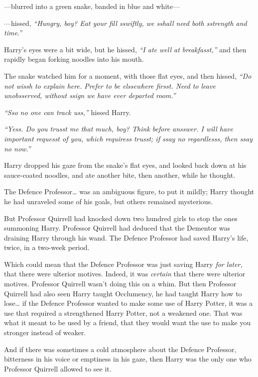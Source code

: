 ---blurred into a green snake, banded in blue and white---

---hissed, \emph{``Hungry, boy? Eat your fill sswiftly, we sshall need
both sstrength and time.''}

Harry's eyes were a bit wide, but he hissed, \emph{``I ate well at
breakfasst,''} and then rapidly began forking noodles into his mouth.

The snake watched him for a moment, with those flat eyes, and then
hissed, \emph{``Do not wissh to explain here. Prefer to be elssewhere
firsst. Need to leave unobsserved, without ssign we have ever departed
room.''}

\emph{``Sso no one can track uss,''} hissed Harry.

\emph{``Yess. Do you trusst me that much, boy? Think before ansswer. I
will have important requesst of you, which requiress trusst; if ssay no
regardlesss, then ssay no now.''}

Harry dropped his gaze from the snake's flat eyes, and looked back down
at his sauce-coated noodles, and ate another bite, then another, while
he thought.

The Defence Professor\ldots{} was an ambiguous figure, to put it mildly;
Harry thought he had unraveled some of his goals, but others remained
mysterious.

But Professor Quirrell had knocked down two hundred girls to stop the
ones summoning Harry. Professor Quirrell had deduced that the Dementor
was draining Harry through his wand. The Defence Professor had saved
Harry's life, twice, in a two-week period.

Which could mean that the Defence Professor was just saving Harry
\emph{for later,} that there were ulterior motives. Indeed, it was
\emph{certain} that there were ulterior motives. Professor Quirrell
wasn't doing this on a whim. But then Professor Quirrell had also seen
Harry taught Occlumency, he had taught Harry how to lose\ldots{} if the
Defence Professor wanted to make some use of Harry Potter, it was a use
that required a strengthened Harry Potter, not a weakened one. That was
what it meant to be used by a friend, that they would want the use to
make you stronger instead of weaker.

And if there was sometimes a cold atmosphere about the Defence
Professor, bitterness in his voice or emptiness in his gaze, then Harry
was the only one who Professor Quirrell allowed to see it.

